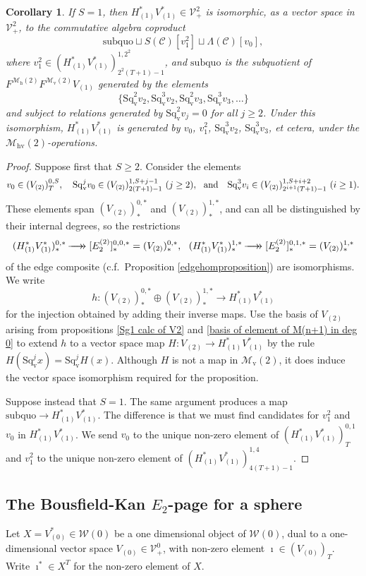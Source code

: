 \documentclass[11pt]{amsart} \renewcommand{\baselinestretch}{1.4}
\theoremstyle{plain}
\newtheorem{cor}[thm]{Corollary}
\theoremstyle{definition}
\renewcommand{\to}{\longrightarrow}
\newcommand{\scrC}{\mathscr{C}}
\newcommand{\calV}{\mathcal{V}}
\newcommand{\calw}{\mathcal{W}}
\newcommand{\calMv}{\mathcal{M}\dver}
\newcommand{\calMh}{\mathcal{M}\dhor}
\newcommand{\calMhv}{\mathcal{M}_\mathrm{hv}}
\newcommand{\CommOperad}{{\scrC}}
\newcommand{\vect}[2]{\calV^{#1}_{#2}}
\newcommand{\epi}{{\,\makebox[0cm][l]{\ensuremath\to}\to{}}}
\newcommand{\E}[5]{[E^{#1}_{#2}#3]^{#4}_{#5}}
\newcommand{\dver}{_\mathrm{v}}
\newcommand{\dhor}{_\mathrm{h}}
\newcommand{\Sqv}{\mathrm{Sq}\dver}
\begin{document}
\begin{Calculations of HWn for n nonzero}
\begin{cor}
If $S=1$, then $H^*_{(1)}V^*_{(1)}\in \vect{2}{+}$ is isomorphic, as a vector space in $\vect{2}{+}$, to the commutative algebra coproduct
\[\mathrm{subquo}\sqcup S(\CommOperad) [v_1^{2}]\sqcup \Lambda(\CommOperad)[v_0],\] where $v_1^2\in(H^*_{(1)}V^*_{(1)})^{1,2^2}_{2^2(T+1)-1}$, and $\mathrm{subquo}$ is the subquotient of $F^{\calMh(2)}F^{\calMv(2)}V_{(1)}$ generated by the elements
\[\{\Sqv^2v_{2},\Sqv^3v_{2},\Sqv^2v_{3},\Sqv^3v_{3},\ldots\}\]
and subject to relations generated by 
$\Sqv^2 v_{j}=0$ for all $j\geq2$. Under this isomorphism, $H^*_{(1)}V^*_{(1)}$ is generated by $v_0$, $ v_1^2$, $\Sqv^3 v_2$, $\Sqv^3 v_3$, et cetera, under the $\calMhv(2)$-operations.
\end{cor}
\begin{proof}
Suppose first that $S\geq2$. Consider the elements
\[v_0\in (V_{(2)})^{0,S}_{T},\ \ \ \Sqv^j v_0\in (V_{(2)})^{1,S+j-1}_{2(T+1)-1}\  \textup{($j\geq2$)},\ \ \textup{and}\ \ \ \Sqv^3v_i\in (V_{(2)})^{1,S+i+2}_{2^{i+1}(T+1)-1}\ \textup{($i\geq1$)}.\]
These elements span $(V_{(2)})^{0,*}_*$ and $(V_{(2)})^{1,*}_*$, and can all be distinguished by their internal degrees, so the restrictions 
\[(H^*_{(1)}V^*_{(1)})^{0,*}_*\epi \E{(2)}{2}{}{0,0,*}{*}=(V_{(2)})^{0,*}_*,\ \ (H^*_{(1)}V^*_{(1)})^{1,*}_*\epi \E{(2)}{2}{}{0,1,*}{*}=(V_{(2)})^{1,*}_*\]
 of the edge composite (c.f.\ Proposition \ref{edgehomproposition}) are isomorphisms. We write
\[h:(V_{(2)})^{0,*}_*\oplus (V_{(2)})^{1,*}_*\to H^*_{(1)}V^*_{(1)}\]
for the injection obtained by adding their inverse maps. Use the basis of $V_{(2)}$ arising from propositions \ref{Sg1 calc of V2} and \ref{basis of element of M(n+1) in deg 0} to extend $h$ to a vector space map $H:V_{(2)}\to H^*_{(1)}V^*_{(1)}$ by the rule $H(\Sqv^jx)=\Sqv^j H(x)$. Although $H$ is not a map in $\calMv(2)$, it does induce the vector space isomorphism required for the proposition.

Suppose instead that $S=1$. The same argument produces a map $\mathrm{subquo}\to H^*_{(1)}V^*_{(1)}$. The difference is that we must find candidates for $v_1^2$ and $v_0$ in $H^*_{(1)}V^*_{(1)}$. We send $v_0$ to the unique non-zero element of $(H^*_{(1)}V^*_{(1)})^{0,1}_{T}$ and $v_1^{2}$ to the unique non-zero element of $(H^*_{(1)}V^*_{(1)})^{1,4}_{4(T+1)-1}$.
\end{proof}






\subsection{\textbf{The Bousfield-Kan $E_2$-page for a sphere}}
\label{Calculations of HW0}
Let $X=V^*_{(0)}\in\calw(0)$ be a one dimensional object of $\calw(0)$, dual to a one-dimensional vector space $V_{(0)}\in\vect{0}{+}$, with non-zero element $\imath\in(V_{(0)})_T$. Write $\imath^*\in X^T$ for the non-zero element of $X$.


\end{Calculations of HWn for n nonzero}
\end{document}
